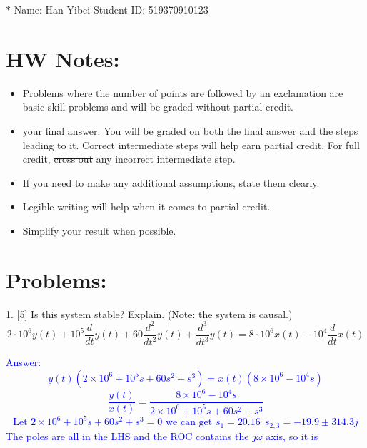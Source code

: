 \documentclass[12pt,a4paper]{article}
\begin{document}
\noindent

\noindent{}

\begin{center}

\footnotesize{\color{blue}$*$ Name: Han Yibei \quad\quad\quad\quad\quad\quad Student ID: 519370910123}
\end{center}

\section*{HW Notes:}
\begin{itemize}
    \item Problems where the number of points are followed by an exclamation are basic skill problems and will be graded without partial credit.
    \item {} your final answer. You will be graded on both the final answer and the steps leading to it. Correct intermediate steps will help earn partial credit.
    For full credit, \sout{cross out} any incorrect intermediate step.
    \item If you need to make any additional assumptions, state them clearly.
    \item Legible writing will help when it comes to partial credit.
    \item Simplify your result when possible.
\end{itemize}

\section*{Problems:}
\normalsize
\begin{tcolorbox}[colback = white]
1. [5] Is this system stable? Explain. (Note: the system is causal.)\\
$$
2 \cdot 10^{6} y(t)+10^{5} \frac{d}{d t} y(t)+60 \frac{d^{2}}{d t^{2}} y(t)+\frac{d^{3}}{d t^{3}} y(t)=8 \cdot 10^{6} x(t)-10^{4} \frac{d}{d t} x(t)
$$

\end{tcolorbox}

\begin{tcolorbox}
\normalsize
\textcolor{blue}{Answer:\\
$$y(t)(2\times 10^6+10^5 s+60 s^2+s^3)=x(t)(8\times 10^6-10^4 s)$$
$$\frac{y(t)}{x(t)}=\frac{8\times 10^6-10^4 s}{2\times 10^6+10^5 s+60 s^2+s^3}$$
$$\text{Let } 2\times 10^6+10^5 s+60 s^2+s^3=0 \text{ we can get } s_1=20.16~~s_{2,3}=-19.9\pm 314.3j$$
The poles are all in the LHS and the ROC contains the $j\omega$ axis, so it is 
}
\end{tcolorbox}
\end{document}
